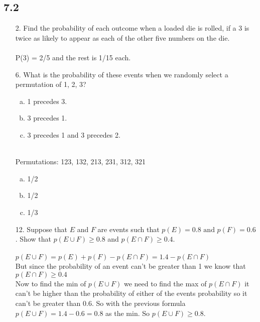 \subsection{7.2}
\begin{itemize}
    \item[2.]  Find the probability of each outcome when a loaded die
          is rolled, if a 3 is twice as likely to appear as each of the
          other five numbers on the die. \\
          \answer \\
          P(3) = 2/5 and the rest is 1/15 each.

    \item[6.]  What is the probability of these events when we randomly
          select a permutation of {1, 2, 3}?
          \begin{enumerate}[a.]
              \item 1 precedes 3.
              \item 3 precedes 1.
              \item 3 precedes 1 and 3 precedes 2.
          \end{enumerate}
          \answer \\
          Permutations: 123, 132, 213, 231, 312, 321
          \begin{enumerate}[a.]
              \item 1/2
              \item 1/2
              \item 1/3
          \end{enumerate}
    \item[12.] Suppose that $E$ and $F$ are events such that $p(E) =
              0.8 \text{ and } p(F) = 0.6$. Show that $p(E \cup F ) \geq 0.8$ and
          $p(E \cap F) \geq 0.4.$ \\
          \answer \\
          $p(E \cup F) = p(E) + p(F) - p(E \cap F) = 1.4 - p(E \cap F)$ \\
          But since the probability of an event can't be greater than 1 we know that
          $p(E \cap F) \geq  0.4$ \\
          Now to find the min of $p(E \cup F)$ we need to find the max of $p(E \cap F)$
          it can't be higher than the probability of either of the events probability so
          it can't be greater than 0.6. So with the previous formula $p(E \cup F) = 1.4 -0.6 = 0.8$
          as the min. So $p(E \cup F) \geq 0.8$.


\end{itemize}
